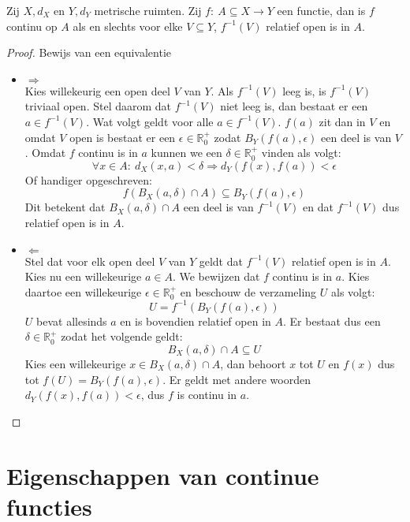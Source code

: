 \documentclass[main.tex]{subfiles}
\begin{document}
\begin{bpr}
  \label{pr:metrische-ruimte-continu-itv-opens}
  Zij $X,d_{X}$ en $Y,d_{Y}$ metrische ruimten.
  Zij $f:\ A \subseteq X \rightarrow Y$ een functie, dan is $f$ continu op $A$ als en slechts voor elke $V \subseteq Y$, $f^{-1}(V)$ relatief open is in $A$.

  \begin{proof}
    Bewijs van een equivalentie
    \begin{itemize}
    \item $\Rightarrow$\\
      Kies willekeurig een open deel $V$ van $Y$.
      Als $f^{-1}(V)$ leeg is, is $f^{-1}(V)$ triviaal open.
      Stel daarom dat $f^{-1}(V)$ niet leeg is, dan bestaat er een $a\in f^{-1}(V)$.
      Wat volgt geldt voor alle $a\in f^{-1}(V)$.
      $f(a)$ zit dan in $V$ en omdat $V$ open is bestaat er een $\epsilon \in \mathbb{R}_{0}^{+}$ zodat $B_{Y}(f(a),\epsilon)$ een deel is van $V$.
      Omdat $f$ continu is in $a$ kunnen we een $\delta\in\mathbb{R}_{0}^{+}$ vinden als volgt:
      \[ \forall x\in A:\ d_{X}(x,a) < \delta \Rightarrow d_{Y}(f(x),f(a)) < \epsilon \]
      Of handiger opgeschreven:
      \[ f\left(B_{X}(a,\delta) \cap A\right) \subseteq B_{Y}(f(a),\epsilon) \]
      Dit betekent dat $B_{X}(a,\delta) \cap A$ een deel is van $f^{-1}(V)$ en dat $f^{-1}(V)$ dus relatief open is in $A$.
    \item $\Leftarrow$\\
      Stel dat voor elk open deel $V$ van $Y$ geldt dat $f^{-1}(V)$ relatief open is in $A$.
      Kies nu een willekeurige $a\in A$.
      We bewijzen dat $f$ continu is in $a$.
      Kies daartoe een willekeurige $\epsilon \in \mathbb{R}_{0}^{+}$ en beschouw de verzameling $U$ als volgt:
      \[ U = f^{-1}\left(B_{Y}(f(a),\epsilon)\right)\]
      $U$ bevat allesinds $a$ en is bovendien relatief open in $A$.
      Er bestaat dus een $\delta \in \mathbb{R}_{0}^{+}$ zodat het volgende geldt:
      \[ B_{X}(a,\delta) \cap A \subseteq U \]
      Kies een willekeurige $x\in B_{X}(a,\delta) \cap A$, dan behoort $x$ tot $U$ en $f(x)$ dus tot $f(U) = B_{Y}\left(f(a),\epsilon\right)$.
      Er geldt met andere woorden $d_{Y}(f(x),f(a)) < \epsilon$, dus $f$ is continu in $a$.
    \end{itemize}
  \end{proof}
\end{bpr}


\section{Eigenschappen van continue functies}
\label{sec:eigensch-van-cont}
\end{document}

